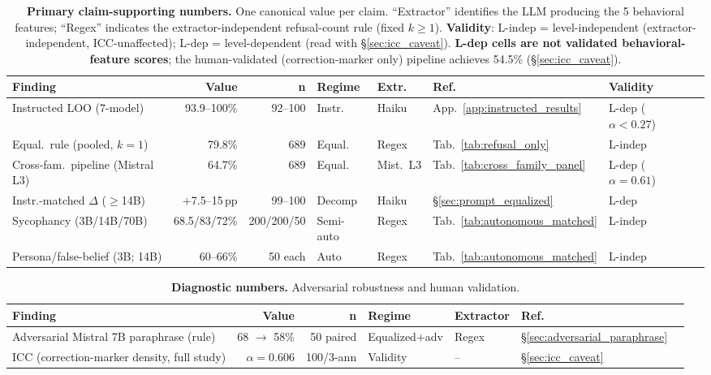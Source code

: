 \begin{table}[h]
\centering
\caption{\textbf{Primary claim-supporting numbers.} One canonical value per claim. ``Extractor'' identifies the LLM producing the 5 behavioral features; ``Regex'' indicates the extractor-independent refusal-count rule (fixed $k\!\geq\!1$). \textbf{Validity}: L-indep = level-independent (extractor-independent, ICC-unaffected); L-dep = level-dependent (read with §\ref{sec:icc_caveat}). \textbf{L-dep cells are not validated behavioral-feature scores}; the human-validated (correction-marker only) pipeline achieves 54.5\% (§\ref{sec:icc_caveat}).}
\label{tab:headlines_primary}
\label{tab:headlines}
\begin{scriptsize}
\setlength{\tabcolsep}{3pt}
\begin{tabular}{lrrlllll}
\toprule
\textbf{Finding} & \textbf{Value} & \textbf{n} & \textbf{Regime} & \textbf{Extr.} & \textbf{Ref.} & \textbf{Validity} \\
\midrule
Instructed LOO (7-model) & 93.9--100\% & 92--100 & Instr. & Haiku & App.~\ref{app:instructed_results} & L-dep ($\alpha{<}0.27$) \\
Equal.\ rule (pooled, $k\!=\!1$) & 79.8\% & 689 & Equal. & Regex & Tab.~\ref{tab:refusal_only} & L-indep \\
Cross-fam.\ pipeline (Mistral L3) & 64.7\% & 689 & Equal. & Mist.\ L3 & Tab.~\ref{tab:cross_family_panel} & L-dep ($\alpha{=}0.61$) \\
Instr.-matched $\Delta$ ($\geq$14B) & $+$7.5--15\,pp & 99--100 & Decomp & Haiku & \S\ref{sec:prompt_equalized} & L-dep \\
Sycophancy (3B/14B/70B) & 68.5/83/72\% & 200/200/50 & Semi-auto & Regex & Tab.~\ref{tab:autonomous_matched} & L-indep \\
Persona/false-belief (3B; 14B) & 60--66\% & 50 each & Auto & Regex & Tab.~\ref{tab:autonomous_matched} & L-indep \\
\bottomrule
\end{tabular}
\end{scriptsize}
\end{table}

\begin{table}[h]
\centering
\setlength{\tabcolsep}{4pt}
\caption{\textbf{Diagnostic numbers.} Adversarial robustness and human validation.}
\label{tab:headlines_diagnostics}
\begin{small}
\begin{tabular}{lrrllll}
\toprule
\textbf{Finding} & \textbf{Value} & \textbf{n} & \textbf{Regime} & \textbf{Extractor} & \textbf{Ref.} \\
\midrule
Adversarial Mistral 7B paraphrase (rule) & 68 $\to$ 58\% & 50 paired & Equalized+adv & Regex & \S\ref{sec:adversarial_paraphrase} \\
ICC (correction-marker density, full study) & $\alpha\!=\!0.606$ & 100/3-ann & Validity & -- & \S\ref{sec:icc_caveat} \\
\bottomrule
\end{tabular}
\end{small}
\end{table}



